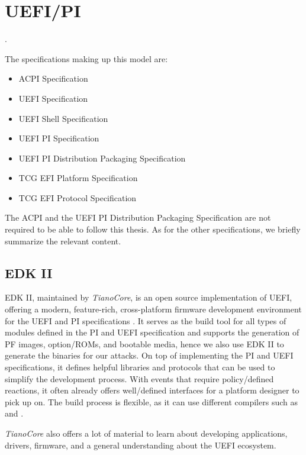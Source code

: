 
\chapter{\acs{UEFI}/\acs{PI}}
\label{sec:uefi-pi}

.

The specifications making up this model are:

\begin{itemize}
    \item \acs{ACPI} Specification
    \item \acs{UEFI} Specification
    \item \acs{UEFI} Shell Specification
    \item \acs{UEFI} \acs{PI} Specification
    \item \acs{UEFI} \acs{PI} Distribution Packaging Specification
    \item \acs{TCG} \acs{EFI} Platform Specification
    \item \acs{TCG} \acs{EFI} Protocol Specification
\end{itemize}

The \ac{ACPI} and the \ac{UEFI} \ac{PI} Distribution Packaging Specification are not required to be able to follow this thesis.
As for the other specifications, we briefly summarize the relevant content.


\clearpage


\clearpage


\clearpage


\section{\acs{EDK} II}

\ac{EDK} II, maintained by \emph{TianoCore}, is an open source implementation of \ac{UEFI}, offering a modern, feature-rich, cross-platform firmware development environment for the \ac{UEFI} and \ac{PI} specifications \cite{tianocore}.
It serves as the build tool for all types of modules defined in the \ac{PI} and \ac{UEFI} specification and supports the generation of \ac{PF} images, option\-/\acp{ROM}, and bootable media, hence we also use \ac{EDK} II to generate the binaries for our attacks.
On top of implementing the \ac{PI} and \ac{UEFI} specifications, it defines helpful libraries and protocols that can be used to simplify the development process.
With events that require policy\-/defined reactions, it often already offers well\-/defined interfaces for a platform designer to pick up on.
The build process is flexible, as it can use different compilers such as  and .

\emph{TianoCore} also offers a lot of material to learn about developing applications, drivers, firmware, and a general understanding about the \ac{UEFI} ecosystem.
